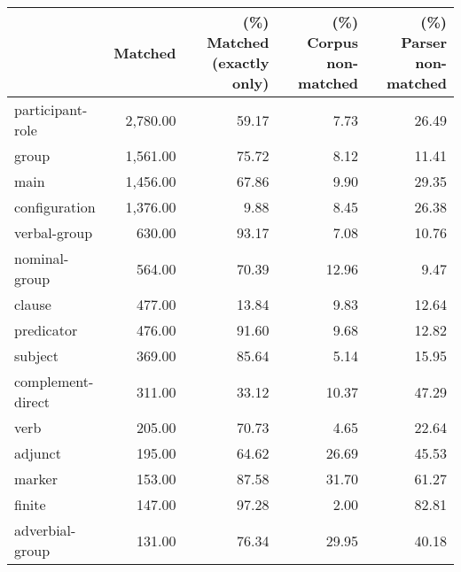 \begin{table}[!ht]
\centering
\begin{tabular}{lrrrr}
\toprule
{} &  Matched &  (\%) Matched (exactly only) &  (\%) Corpus non-matched &  (\%) Parser non-matched \\
\midrule
participant-role          & 2,780.00 &                       59.17 &                    7.73 &                   26.49 \\
group                     & 1,561.00 &                       75.72 &                    8.12 &                   11.41 \\
main                      & 1,456.00 &                       67.86 &                    9.90 &                   29.35 \\
configuration             & 1,376.00 &                        9.88 &                    8.45 &                   26.38 \\
verbal-group              &   630.00 &                       93.17 &                    7.08 &                   10.76 \\
nominal-group             &   564.00 &                       70.39 &                   12.96 &                    9.47 \\
clause                    &   477.00 &                       13.84 &                    9.83 &                   12.64 \\
predicator                &   476.00 &                       91.60 &                    9.68 &                   12.82 \\
subject                   &   369.00 &                       85.64 &                    5.14 &                   15.95 \\
complement-direct         &   311.00 &                       33.12 &                   10.37 &                   47.29 \\
verb                      &   205.00 &                       70.73 &                    4.65 &                   22.64 \\
adjunct                   &   195.00 &                       64.62 &                   26.69 &                   45.53 \\
marker                    &   153.00 &                       87.58 &                   31.70 &                   61.27 \\
finite                    &   147.00 &                       97.28 &                    2.00 &                   82.81 \\
adverbial-group           &   131.00 &                       76.34 &                   29.95 &                   40.18 \\

\end{tabular}
\end{table}
